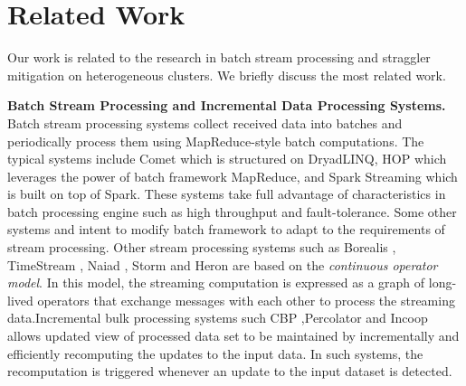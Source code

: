 \section{Related Work}

  Our work is related to the research in batch stream processing and straggler mitigation on heterogeneous clusters. We briefly discuss the most related work.

  \textbf{Batch Stream Processing and Incremental Data Processing Systems.} Batch stream processing systems collect received data into batches and periodically process them using MapReduce-style batch computations. The typical systems include Comet \cite{He2010} which is structured on DryadLINQ, HOP \cite{Condie2010} which leverages the power of batch framework MapReduce, and Spark Streaming \cite{Zaharia2013} which is built on top of Spark. These systems take full advantage of characteristics in batch processing engine such as high throughput and fault-tolerance. Some other systems \cite{Li2011} and \cite{Lam2012} intent to modify batch framework to adapt to the requirements of stream processing. Other stream processing systems such as Borealis \cite{Abadi2005}, TimeStream \cite{Qian2013}, Naiad \cite{Murray2013}, Storm \cite{Toshniwal2014} and Heron \cite{Kulkarni2015} are based on the \emph{continuous operator model}. In this model, the streaming computation is expressed as a graph of long-lived operators that exchange messages with each other to process the streaming data.Incremental bulk processing systems such CBP \cite{Logothetis2010},Percolator \cite{Peng2010} and Incoop \cite{Bhatotia2011a} allows updated view of processed data set to be maintained by incrementally and efficiently recomputing the updates to the input data. In such systems, the recomputation is triggered whenever an update to the input dataset is detected.

